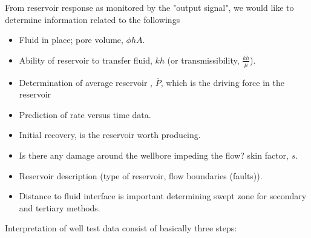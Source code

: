 \documentclass{llncs}
\begin{document}
From reservoir response as monitored by the "output signal", we would like to determine information related to the followings
\begin{itemize}
    \item Fluid in place; pore volume, ${\phi}hA$.
    \item Ability of reservoir to transfer fluid, $kh$ (or transmissibility, $\frac{kh}{\mu}$).
    \item Determination of average reservoir , $\overline{P}$, which is the driving force in the reservoir 
    \item Prediction of rate versus time data.
    \item Initial recovery, is the reservoir worth producing.
    \item Is there any damage around the wellbore impeding the flow? skin factor, $s$.
    \item Reservoir description (type of reservoir, flow boundaries (faults)).
    \item Distance to fluid interface  is important determining swept zone for secondary and tertiary methods.
\end{itemize}
Interpretation of well test data consist of basically three steps:
\end{document}
